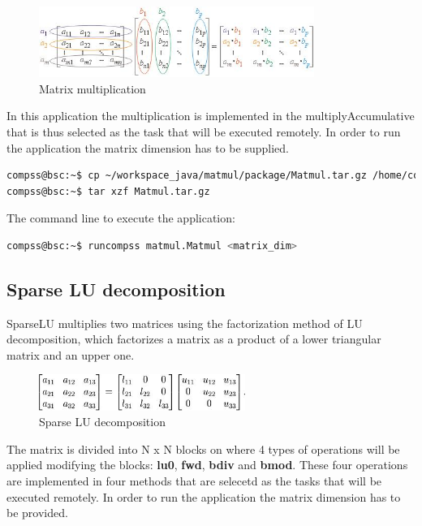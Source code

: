 \begin{figure}[ht!]
  \centering
    \includegraphics[width=0.8\textwidth]{./Sections/2_Java/Figures/matrix.jpeg}
    \caption{Matrix multiplication} 
    \label{fig:matrix}
\end{figure}

In this application the multiplication is implemented in the multiplyAccumulative that is thus selected 
as the task that will be executed remotely. In order to run the application the matrix dimension has to 
be supplied.

\begin{lstlisting}[language=bash]
compss@bsc:~$ cp ~/workspace_java/matmul/package/Matmul.tar.gz /home/compss/
compss@bsc:~$ tar xzf Matmul.tar.gz
\end{lstlisting}

The command line to execute the application:

\begin{lstlisting}[language=bash]
compss@bsc:~$ runcompss matmul.Matmul <matrix_dim>
\end{lstlisting}

\subsection{Sparse LU decomposition}
SparseLU multiplies two matrices using the factorization method of LU decomposition, which factorizes a 
matrix as a product of a lower triangular matrix and an upper one.

\begin{figure}[ht!]
  \centering
    \includegraphics[width=0.6\textwidth]{./Sections/2_Java/Figures/SparseLU.jpeg}
    \caption{Sparse LU decomposition}
    \label{fig:SparseLO}
\end{figure}

The matrix is divided into N x N blocks on where 4 types of operations will be applied modifying the blocks: 
{\bf lu0}, {\bf fwd}, {\bf bdiv} and {\bf bmod}. These four operations are implemented in four methods that 
are selecetd as the tasks that will be executed remotely. In order to run the application the matrix dimension 
has to be provided.

